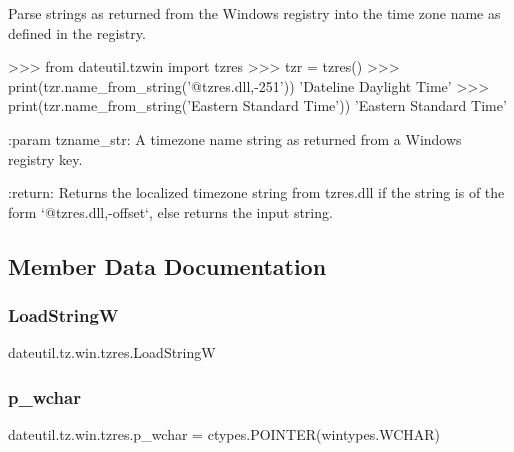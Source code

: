 \begin{DoxyVerb}Parse strings as returned from the Windows registry into the time zone
name as defined in the registry.

>>> from dateutil.tzwin import tzres
>>> tzr = tzres()
>>> print(tzr.name_from_string('@tzres.dll,-251'))
'Dateline Daylight Time'
>>> print(tzr.name_from_string('Eastern Standard Time'))
'Eastern Standard Time'

:param tzname_str:
    A timezone name string as returned from a Windows registry key.

:return:
    Returns the localized timezone string from tzres.dll if the string
    is of the form `@tzres.dll,-offset`, else returns the input string.
\end{DoxyVerb}
 

\subsection{Member Data Documentation}
\mbox{\label{classdateutil_1_1tz_1_1win_1_1tzres_ab4ac9505f4939c48ac6a826646773bef}} 
\subsubsection{\texorpdfstring{Load\+StringW}{LoadStringW}}
{\footnotesize\ttfamily dateutil.\+tz.\+win.\+tzres.\+Load\+StringW}

\mbox{\label{classdateutil_1_1tz_1_1win_1_1tzres_aeeaa8963623c39ec9e593ce3eaf9eeee}} 
\subsubsection{\texorpdfstring{p\+\_\+wchar}{p\_wchar}}
{\footnotesize\ttfamily dateutil.\+tz.\+win.\+tzres.\+p\+\_\+wchar = ctypes.\+P\+O\+I\+N\+T\+ER(wintypes.\+W\+C\+H\+AR)\hspace{0.3cm}{\ttfamily [static]}}

\mbox{\label{classdateutil_1_1tz_1_1win_1_1tzres_ac5f17128079cebb8d7851be15c667e0a}} 
